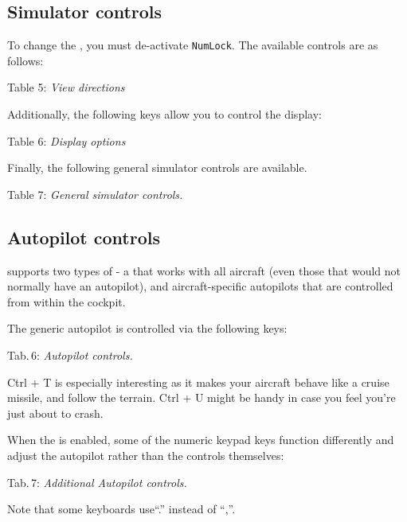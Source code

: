 \subsection{Simulator controls}

To change the , you must de-activate \texttt{NumLock}. The available controls are as follows:
\medskip

\centerline{}
Table 5: \textit{View directions}
\medskip

Additionally, the following keys allow you to control the display:
\medskip

\noindent
\centerline{}
Table 6: \textit{Display options}
\medskip

Finally, the following general simulator controls are available.

\medskip
\centerline{}
Table 7: \textit{General simulator controls.}
\medskip

\subsection{Autopilot controls}

\FlightGear{} supports two types of  - a 
that works with all aircraft (even those that would not normally have an autopilot),
and aircraft-specific autopilots that are controlled from within the cockpit.

The generic autopilot is controlled via the following keys:

\medskip

\centerline{}
\noindent
 Tab.\,6: \textit{Autopilot controls.}
\medskip

\noindent Ctrl + T is especially interesting as it makes your aircraft behave
like a cruise missile, and follow the terrain. Ctrl + U might be handy in case
you feel you're just about to crash.

When the  is enabled, some of the numeric keypad keys function
differently and adjust the autopilot rather than the controls themselves:

\medskip
\centerline{}
\noindent
 Tab.\,7: \textit{Additional Autopilot controls.}
\medskip

Note that some keyboards use``.'' instead of ``,''.

